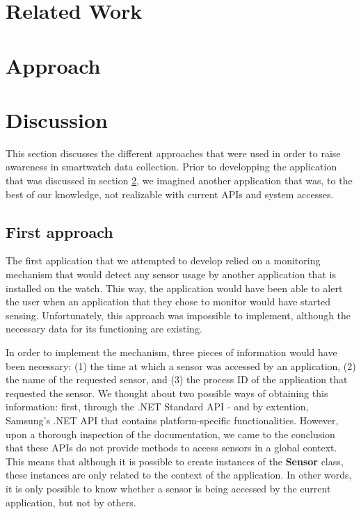 \documentclass[conference, a4paper, 10pt, twocolumn]{IEEEtran}
\begin{document}
\section{Related Work}

\section{Approach}\label{approach}

\section{Discussion}
This section discusses the different approaches that were used in order to raise awareness in smartwatch data collection. Prior to developping the application that was discussed in section \ref{approach}, we imagined another application that was, to the best of our knowledge, not realizable with current \acp{API} and system accesses.  

\subsection{First approach}
The first application that we attempted to develop relied on a monitoring mechanism that would detect any sensor usage by another application that is installed on the watch. This way, the application would have been able to alert the user when an application that they chose to monitor would have started sensing. Unfortunately, this approach was impossible to implement, although the necessary data for its functioning are existing.

In order to implement the mechanism, three pieces of information would have been necessary: (1) the time at which a sensor was accessed by an application, (2) the name of the requested sensor, and (3) the process ID of the application that requested the sensor. We thought about two possible ways of obtaining this information: first, through the .NET Standard \ac{API} - and by extention, Samsung's .NET \ac{API} that contains platform-specific functionalities\cite{tizen}. However, upon a thorough inspection of the documentation, we came to the conclusion that these \acp{API} do not provide methods to access sensors in a global context. This means that although it is possible to create instances of the \textbf{Sensor} class, these instances are only related to the context of the application. In other words, it is only possible to know whether a sensor is being accessed by the current application, but not by others. 
\end{document}
